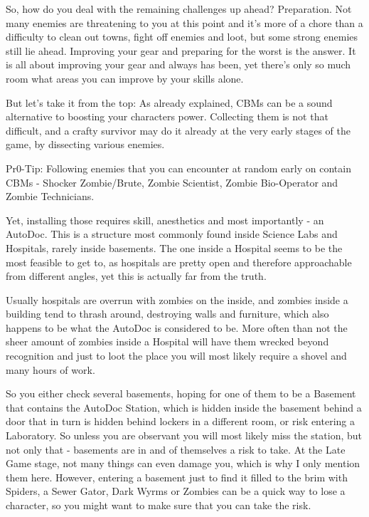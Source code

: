 So, how do you deal with the remaining challenges up ahead? Preparation. Not many enemies are threatening to you at this point and it's more of a chore than a difficulty to clean out towns, fight off enemies and loot, but some strong enemies still lie ahead. Improving your gear and preparing for the worst is the answer. It is all about improving your gear and always has been, yet there's only so much room what areas you can improve by your skills alone.

But let's take it from the top:
As already explained, CBMs can be a sound alternative to boosting your characters power. Collecting them is not that difficult, and a crafty survivor may do it already at the very early stages of the game, by dissecting various enemies.

Pr0-Tip: Following enemies that you can encounter at random early on contain CBMs - Shocker Zombie/Brute, Zombie Scientist, Zombie Bio-Operator and Zombie Technicians.

Yet, installing those requires skill, anesthetics and most importantly - an AutoDoc. This is a structure most commonly found inside Science Labs and Hospitals, rarely inside basements. The one inside a Hospital seems to be the most feasible to get to, as hospitals are pretty open and therefore approachable from different angles, yet this is actually far from the truth.

Usually hospitals are overrun with zombies on the inside, and zombies inside a building tend to thrash around, destroying walls and furniture, which also happens to be what the AutoDoc is considered to be. More often than not the sheer amount of zombies inside a Hospital will have them wrecked beyond recognition and just to loot the place you will most likely require a shovel and many hours of work.

So you either check several basements, hoping for one of them to be a Basement that contains the AutoDoc Station, which is hidden inside the basement behind a door that in turn is hidden behind lockers in a different room, or risk entering a Laboratory. So unless you are observant you will most likely miss the station, but not only that - basements are in and of themselves a risk to take. At the Late Game stage, not many things can even damage you, which is why I only mention them here. However, entering a basement just to find it filled to the brim with Spiders, a Sewer Gator, Dark Wyrms or Zombies can be a quick way to lose a character, so you might want to make sure that you can take the risk.


